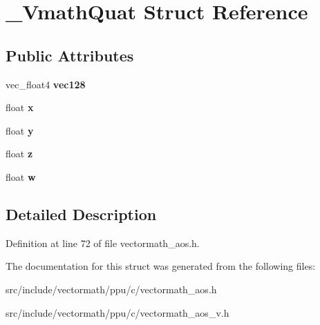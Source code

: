\hypertarget{struct__VmathQuat}{\section{\-\_\-\-Vmath\-Quat Struct Reference}
\label{struct__VmathQuat}
}
\subsection*{Public Attributes}
\begin{DoxyCompactItemize}
\item 
\hypertarget{struct__VmathQuat_a67806d6661eecf4c56ca8a3717515c4e}{vec\-\_\-float4 {\bfseries vec128}}\label{struct__VmathQuat_a67806d6661eecf4c56ca8a3717515c4e}

\item 
\hypertarget{struct__VmathQuat_a2dbcad27831e4ea04031e85bd9b60c62}{float {\bfseries x}}\label{struct__VmathQuat_a2dbcad27831e4ea04031e85bd9b60c62}

\item 
\hypertarget{struct__VmathQuat_a70a9b3343881694bcc663be94bdbe843}{float {\bfseries y}}\label{struct__VmathQuat_a70a9b3343881694bcc663be94bdbe843}

\item 
\hypertarget{struct__VmathQuat_a2a428878fe92f133093a3ec1ed2ba6ec}{float {\bfseries z}}\label{struct__VmathQuat_a2a428878fe92f133093a3ec1ed2ba6ec}

\item 
\hypertarget{struct__VmathQuat_a537175284e6b24b3c731d9e3b7cb2b47}{float {\bfseries w}}\label{struct__VmathQuat_a537175284e6b24b3c731d9e3b7cb2b47}

\end{DoxyCompactItemize}


\subsection{Detailed Description}


Definition at line 72 of file vectormath\-\_\-aos.\-h.



The documentation for this struct was generated from the following files\-:\begin{DoxyCompactItemize}
\item 
src/include/vectormath/ppu/c/vectormath\-\_\-aos.\-h\item 
src/include/vectormath/ppu/c/vectormath\-\_\-aos\-\_\-v.\-h\end{DoxyCompactItemize}
